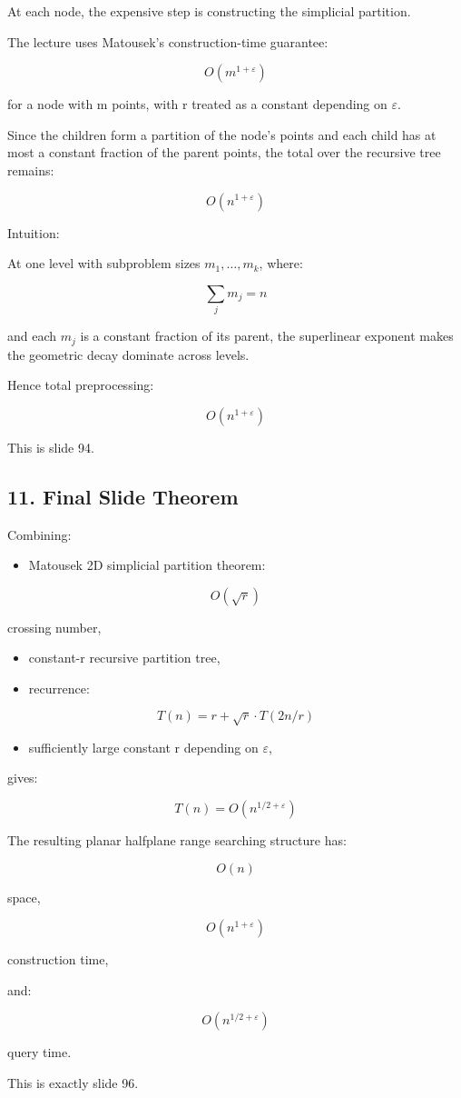 \documentclass[
  11pt,
]{article}
\providecommand{\tightlist}{%
  \setlength{\itemsep}{0pt}\setlength{\parskip}{0pt}}
\begin{document}
At each node, the expensive step is constructing the simplicial
partition.

The lecture uses Matousek's construction-time guarantee:

\[
O(m^{1+\varepsilon})
\]

for a node with m points, with r treated as a constant depending on
\(\varepsilon\).

Since the children form a partition of the node's points and each child
has at most a constant fraction of the parent points, the total over the
recursive tree remains:

\[
O(n^{1+\varepsilon})
\]

Intuition:

At one level with subproblem sizes \(m_1,\ldots,m_k\), where:

\[
\sum_j m_j=n
\]

and each \(m_j\) is a constant fraction of its parent, the superlinear
exponent makes the geometric decay dominate across levels.

Hence total preprocessing:

\[
O(n^{1+\varepsilon})
\]

This is slide 94.

\hypertarget{final-slide-theorem}{%
\subsection{11. Final Slide Theorem}\label{final-slide-theorem}}

Combining:

\begin{itemize}
\tightlist
\item
  Matousek 2D simplicial partition theorem:
\end{itemize}

\[
O(\sqrt r)
\]

crossing number,

\begin{itemize}
\tightlist
\item
  constant-r recursive partition tree,
\item
  recurrence:
\end{itemize}

\[
T(n)=r+\sqrt r\cdot T(2n/r)
\]

\begin{itemize}
\tightlist
\item
  sufficiently large constant r depending on \(\varepsilon\),
\end{itemize}

gives:

\[
T(n)=O(n^{1/2+\varepsilon})
\]

The resulting planar halfplane range searching structure has:

\[
O(n)
\]

space,

\[
O(n^{1+\varepsilon})
\]

construction time,

and:

\[
O(n^{1/2+\varepsilon})
\]

query time.

This is exactly slide 96.
\end{document}

